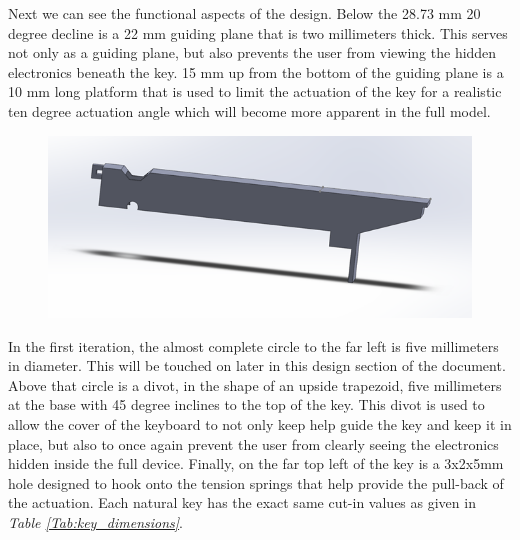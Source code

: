Next we can see the functional aspects of the design. Below the 28.73 mm 20 degree decline is a 22 mm guiding plane that is two millimeters thick. This serves not only as a guiding plane, but also prevents the user from viewing the hidden electronics beneath the key. 15 mm up from the bottom of the guiding plane is a 10 mm long platform that is used to limit the actuation of the key for a realistic ten degree actuation angle which will become more apparent in the full model.

\begin{figure}[h!]
  \centering
  \includegraphics[width=0.8\linewidth]{image/WhiteModel2.png}
  \caption{}
  \label{fig:white_model2}
\end{figure}

In the first iteration, the almost complete circle to the far left is five millimeters in diameter. This will be touched on later in this design section of the document. Above that circle is a divot, in the shape of an upside trapezoid, five millimeters at the base with 45 degree inclines to the top of the key. This divot is used to allow the cover of the keyboard to not only keep help guide the key and keep it in place, but also to once again prevent the user from clearly seeing the electronics hidden inside the full device. Finally, on the far top left of the key is a 3x2x5mm hole designed to hook onto the tension springs that help provide the pull-back of the actuation. Each natural key has the exact same cut-in values as given in \textit{Table \ref{Tab:key_dimensions}}.

